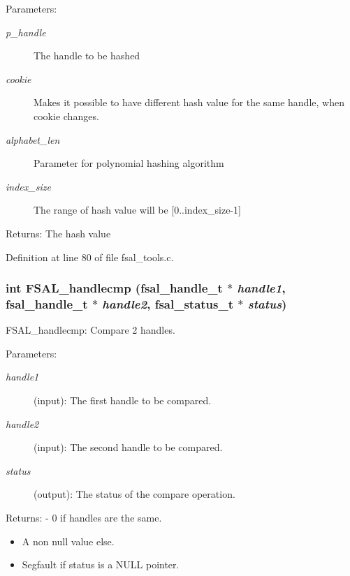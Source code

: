 \begin{Desc}
\item[Parameters:]
\begin{description}
\item[{\em p\_\-handle}]The handle to be hashed \item[{\em cookie}]Makes it possible to have different hash value for the same handle, when cookie changes. \item[{\em alphabet\_\-len}]Parameter for polynomial hashing algorithm \item[{\em index\_\-size}]The range of hash value will be [0..index\_\-size-1]\end{description}
\end{Desc}
\begin{Desc}
\item[Returns:]The hash value \end{Desc}


Definition at line 80 of file fsal\_\-tools.c.
\subsubsection{\setlength{\rightskip}{0pt plus 5cm}int FSAL\_\-handlecmp (fsal\_\-handle\_\-t $\ast$ {\em handle1}, fsal\_\-handle\_\-t $\ast$ {\em handle2}, fsal\_\-status\_\-t $\ast$ {\em status})}\label{fsal__tools_8c_a3}


FSAL\_\-handlecmp: Compare 2 handles.

\begin{Desc}
\item[Parameters:]
\begin{description}
\item[{\em handle1}](input): The first handle to be compared. \item[{\em handle2}](input): The second handle to be compared. \item[{\em status}](output): The status of the compare operation.\end{description}
\end{Desc}
\begin{Desc}
\item[Returns:]- 0 if handles are the same.\begin{itemize}
\item A non null value else.\item Segfault if status is a NULL pointer. \end{itemize}
\end{Desc}


